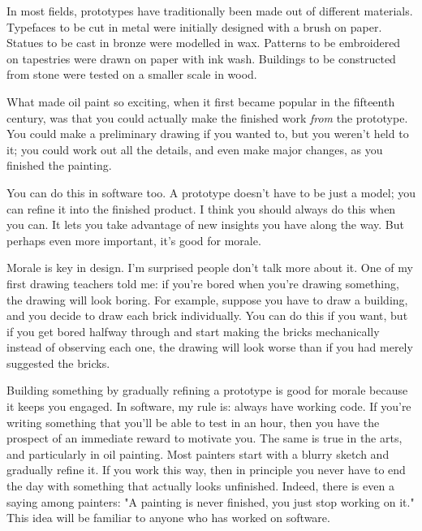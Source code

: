 In most fields, prototypes
                  have traditionally been made out of different materials.
                  Typefaces to be cut in metal were initially designed with a
                  brush on paper. Statues to be cast in bronze were modelled in
                  wax. Patterns to be embroidered on tapestries were drawn on
                  paper with ink wash. Buildings to be constructed from stone
                  were tested on a smaller scale in wood.

What made
                  oil paint so exciting, when it first became popular in the
                  fifteenth century, was that you could actually make the
                  finished work \emph{from} the prototype. You could make a
                  preliminary drawing if you wanted to, but you weren't held to
                  it; you could work out all the details, and even make major
                  changes, as you finished the painting.

You can do
                  this in software too. A prototype doesn't have to be just a
                  model; you can refine it into the finished product. I think
                  you should always do this when you can. It lets you take
                  advantage of new insights you have along the way. But perhaps
                  even more important, it's good for morale.



Morale
                  is key in design. I'm surprised people don't talk more about
                  it. One of my first drawing teachers told me: if you're bored
                  when you're drawing something, the drawing will look boring.
                  For example, suppose you have to draw a building, and you
                  decide to draw each brick individually. You can do this if you
                  want, but if you get bored halfway through and start making
                  the bricks mechanically instead of observing each one, the
                  drawing will look worse than if you had merely suggested the
                  bricks.

Building something by gradually refining a
                  prototype is good for morale because it keeps you engaged. In
                  software, my rule is: always have working code. If you're
                  writing something that you'll be able to test in an hour, then
                  you have the prospect of an immediate reward to motivate you.
                  The same is true in the arts, and particularly in oil
                  painting. Most painters start with a blurry sketch and
                  gradually refine it. If you work this way, then in principle
                  you never have to end the day with something that actually
                  looks unfinished. Indeed, there is even a saying among
                  painters: "A painting is never finished, you just stop working
                  on it." This idea will be familiar to anyone who has worked on
                  software.

